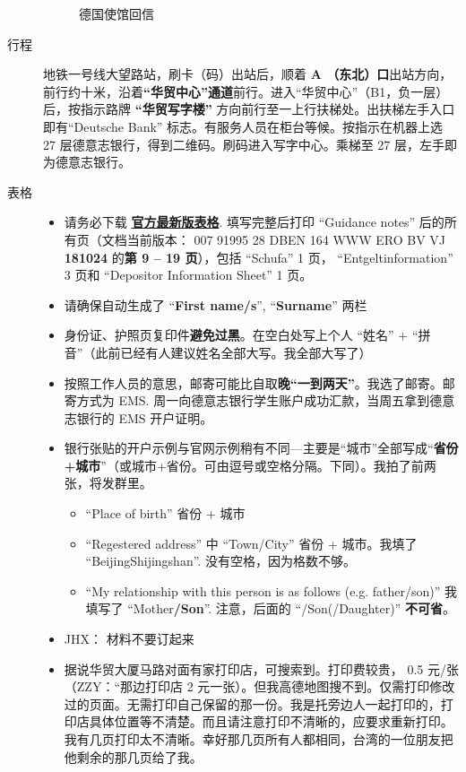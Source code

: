 \documentclass[final]{book}
\begin{document}
\begin{appendices}
\begin{description}
\begin{figure}[htbp]
  \caption{德国使馆回信}
  \label{fig:email}
\end{figure}
\item[行程] 地铁一号线大望路站，刷卡（码）出站后，顺着 \textbf{\color{blue}A （东北）口}出站方向，前行约十米，沿着\textbf{\color{blue}“华贸中心”通道}前行。进入“华贸中心”（B1，负一层）后，按指示路牌 \textbf{\color{blue}“华贸写字楼”} 方向前行至一上行扶梯处。出扶梯左手入口即有``Deutsche Bank'' 标志。有服务人员在柜台等候。按指示在机器上选 27 层德意志银行，得到二维码。刷码进入写字中心。乘梯至 27 层，左手即为德意志银行。
\item[表格]
\begin{itemize}
  \item 请务必下载 \href{https://china.db.com/china/docs/1.opening\_a\_bank\_account\_for\_foreign\_students\_over18years.pdf}{\textbf{\color{blue}官方最新版表格}}. 填写完整后打印 ``Guidance notes'' 后的所有页（文档当前版本：
  007 91995 28 DBEN 164 WWW ERO BV VJ \textbf{\color{blue}181024} 的\textbf{\color{blue}第 9 -- 19 页}），包括 ``Schufa'' 1 页， ``Entgeltinformation'' 3 页和 ``Depositor Information Sheet'' 1 页。 
  \item 请确保自动生成了 ``\textbf{\color{blue}First name/s}'', ``\textbf{\color{blue}Surname}'' 两栏
  \item 身份证、护照页复印件\textbf{避免过黑}。在空白处写上个人 “姓名” + “拼音”（此前已经有人建议姓名全部大写。我全部大写了）
  \item 按照工作人员的意思，邮寄可能比自取\textbf{\color{blue}晚“一到两天”}。我选了邮寄。邮寄方式为 EMS. 周一向德意志银行学生账户成功汇款，当周五拿到德意志银行的 EMS 开户证明。
  \item 银行张贴的开户示例与官网示例稍有不同---主要是“城市”全部写成“\textbf{\color{blue}省份+城市}”（或城市+省份。可由逗号或空格分隔。下同）。我拍了前两张，将发群里。
  \begin{itemize}
    \item ``Place of birth'' 省份 + 城市
    \item ``Regestered address'' 中 ``Town/City'' 省份 + 城市。我填了 ``BeijingShijingshan''. 没有空格，因为格数不够。
    \item ``My relationship with this person is as follows (e.g. father/son)'' 我填写了 ``Mother\textbf{\color{blue}/Son}''. 注意，后面的 ``/Son(/Daughter)'' \textbf{\color{blue}不可省}。
  \end{itemize}
\item JHX： 材料不要订起来
\item 据说华贸大厦马路对面有家打印店，可搜索到。打印费较贵， 0.5 元/张（ZZY：“那边打印店 2 元一张）。但我高德地图搜不到。仅需打印修改过的页面。{\color{blue}无需打印自己保留的那一份}。我是托旁边人一起打印的，打印店具体位置等不清楚。而且请注意{\color{blue}打印不清晰的，应要求重新打印}。我有几页打印太不清晰。幸好那几页所有人都相同，台湾的一位朋友把他剩余的那几页给了我。

\end{itemize}
\end{description}
\end{appendices}
\end{document}
